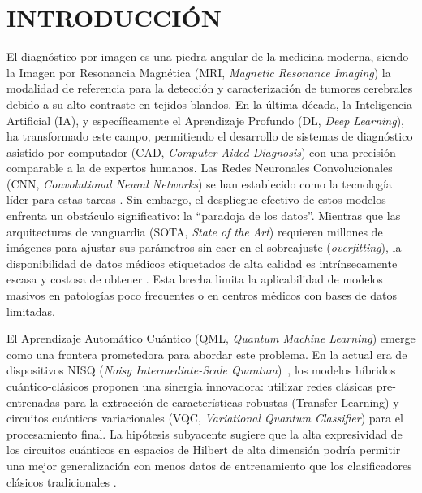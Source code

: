 \documentclass[12pt,letterpaper]{article}
\begin{document}
    \clearpage
    \hypersetup{pageanchor=true}

    \makeatletter
    \renewcommand{\cftdotsep}{10000}
    \makeatother

    \setlength{\cftfigindent}{0pt}
    \setlength{\cfttabindent}{0pt}

    \newpage
    \noindent\renewcommand{\contentsname}{\textbf{CONTENIDO}}
    \vspace{-1cm}
    {
        \hypersetup{linkcolor=black}
        \textbf{\tableofcontents}
    }

    \newpage
    \section*{INTRODUCCIÓN}
    \vspace{-0.5cm}

    El diagnóstico por imagen es una piedra angular de la medicina moderna, siendo la Imagen por Resonancia Magnética (MRI, \textit{Magnetic Resonance Imaging}) la modalidad de referencia para la detección y caracterización de tumores cerebrales debido a su alto contraste en tejidos blandos.
    En la última década, la Inteligencia Artificial (IA), y específicamente el Aprendizaje Profundo (DL, \textit{Deep Learning}), ha transformado este campo, permitiendo el desarrollo de sistemas de diagnóstico asistido por computador (CAD, \textit{Computer-Aided Diagnosis}) con una precisión comparable a la de expertos humanos.
    Las Redes Neuronales Convolucionales (CNN, \textit{Convolutional Neural Networks}) se han establecido como la tecnología líder para estas tareas \citep{he2016deep}.
    Sin embargo, el despliegue efectivo de estos modelos enfrenta un obstáculo significativo: la ``paradoja de los datos''.
    Mientras que las arquitecturas de vanguardia (SOTA, \textit{State of the Art}) requieren millones de imágenes para ajustar sus parámetros sin caer en el sobreajuste (\textit{overfitting}), la disponibilidad de datos médicos etiquetados de alta calidad es intrínsecamente escasa y costosa de obtener \citep{litjens2017survey, willemink2020preparing, esteva2019guide}. Esta brecha limita la aplicabilidad de modelos masivos en patologías poco frecuentes o en centros médicos con bases de datos limitadas.

    El Aprendizaje Automático Cuántico (QML, \textit{Quantum Machine Learning}) emerge como una frontera prometedora para abordar este problema.
    En la actual era de dispositivos NISQ (\textit{Noisy Intermediate-Scale Quantum})~\citep{Preskill2018}, los modelos híbridos cuántico-clásicos proponen una sinergia innovadora: utilizar redes clásicas pre-entrenadas para la extracción de características robustas (Transfer Learning) y circuitos cuánticos variacionales (VQC, \textit{Variational Quantum Classifier}) para el procesamiento final.
    La hipótesis subyacente sugiere que la alta expresividad de los circuitos cuánticos en espacios de Hilbert de alta dimensión podría permitir una mejor generalización con menos datos de entrenamiento que los clasificadores clásicos tradicionales \citep{mari2020transfer, abbas2021power}.
\end{document}
